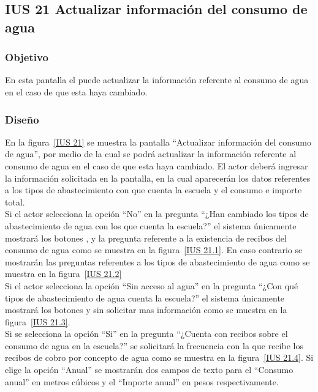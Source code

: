\subsection{IUS 21 Actualizar información del consumo de agua}

\subsubsection{Objetivo}

      En esta pantalla el  puede actualizar la información referente al consumo de agua en el caso de que esta haya cambiado.

\subsubsection{Diseño}

    En la figura~\ref{IUS 21} se muestra la pantalla ``Actualizar información del consumo de agua'', por medio de la cual se podrá actualizar la información referente al consumo de agua en el caso de que esta haya cambiado. El actor deberá ingresar la información solicitada en la pantalla, en la cual aparecerán los datos referentes a los tipos de abastecimiento con que cuenta la escuela y el consumo e importe total.\\
    
    Si el actor selecciona la opción ``No'' en la pregunta ``¿Han cambiado los tipos de abastecimiento de agua con los que cuenta la escuela?'' el sistema únicamente mostrará los botones ,  y la pregunta referente a la existencia de recibos del consumo de agua como se muestra en la figura~\ref{IUS 21.1}. En caso contrario se mostrarán las preguntas referentes a los tipos de abastecimiento de agua como se muestra en la figura~\ref{IUS 21.2}\\
    
    Si el actor selecciona la opción ``Sin acceso al agua'' en la pregunta ``¿Con qué tipos de abastecimiento de agua cuenta la escuela?'' el sistema únicamente mostrará los botones  y  sin solicitar mas información como se muestra en la figura~\ref{IUS 21.3}.\\
    
    Si se selecciona la opción ``Si'' en la pregunta ``¿Cuenta con recibos sobre el consumo de agua en la escuela?'' se solicitará la frecuencia con la que recibe los recibos de cobro por concepto de agua como se muestra en la figura~\ref{IUS 21.4}. Si elige la opción ``Anual'' se mostrarán dos campos de texto para el ``Consumo anual'' en metros cúbicos y el ``Importe anual'' en pesos respectivamente.\\
    
